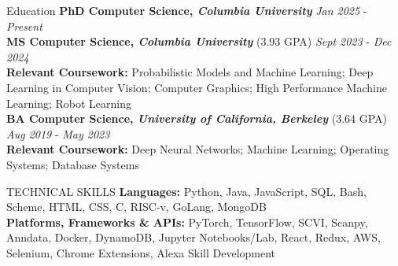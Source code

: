 \documentclass{resume} %
\begin{document}

\begin{rSection}{Education}
{\bf PhD Computer Science, \textit{Columbia University}} \hfill {\textit{Jan 2025} - \textit{Present}}\\
{\bf MS Computer Science, \textit{Columbia University}} (3.93 GPA) \hfill {\textit{Sept 2023} - \textit{Dec 2024}}\\
\hspace*{6mm} \textbf{Relevant Coursework:} Probabilistic Models and Machine Learning; Deep Learning in Computer Vision; Computer \hspace*{6mm}Graphics; High Performance Machine Learning; Robot Learning \\
{\bf BA Computer Science, \textit{University of California, Berkeley}} (3.64 GPA) \hfill {\textit{Aug 2019} - \textit{May 2023}}\\
\hspace*{6mm} \textbf{Relevant Coursework:} Deep Neural Networks; Machine Learning; Operating Systems; Database Systems
\end{rSection}
\vspace{-2mm}
\begin{rSection}{TECHNICAL SKILLS}
{\bf Languages:} Python, Java, JavaScript, SQL, Bash, Scheme, HTML, CSS, C, RISC-v, GoLang, MongoDB
\\
{\bf Platforms, Frameworks \& APIs:} PyTorch, TensorFlow, SCVI, Scanpy, Anndata, Docker, DynamoDB, Jupyter Notebooks/Lab, React, Redux, AWS, Selenium, Chrome Extensions, Alexa Skill Development
\end{rSection}
\vspace{-2mm}
\end{document}
